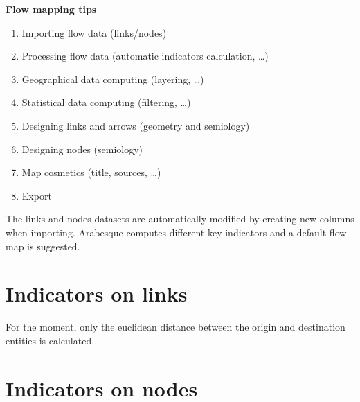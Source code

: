 \documentclass[
  letterpaper,
  DIV=11,
  numbers=noendperiod]{scrreprt}
\providecommand{\tightlist}{%
  \setlength{\itemsep}{0pt}\setlength{\parskip}{0pt}}\usepackage{longtable,booktabs,array}
\begin{document}
\begin{tcolorbox}[enhanced jigsaw, rightrule=.15mm, bottomrule=.15mm, colback=white, breakable, opacityback=0, colframe=quarto-callout-tip-color-frame, toprule=.15mm, leftrule=.75mm, arc=.35mm, left=2mm]
\begin{minipage}[t]{5.5mm}
\textcolor{quarto-callout-tip-color}{\faLightbulb}
\end{minipage}%
\begin{minipage}[t]{\textwidth - 5.5mm}

\vspace{-3mm}\textbf{Flow mapping tips}\vspace{3mm}

\begin{enumerate}
\def\labelenumi{\arabic{enumi}.}
\tightlist
\item
  Importing flow data (links/nodes)
\item
  Processing flow data (automatic indicators calculation, \ldots)
\item
  Geographical data computing (layering, \ldots)
\item
  Statistical data computing (filtering, \ldots)
\item
  Designing links and arrows (geometry and semiology)
\item
  Designing nodes (semiology)
\item
  Map cosmetics (title, sources, \ldots)
\item
  Export
\end{enumerate}

\end{minipage}%
\end{tcolorbox}

The links and nodes datasets are automatically modified by creating new
columns when importing. Arabesque computes different key indicators and
a default flow map is suggested.

\section{Indicators on links}\label{indicators-on-links}

For the moment, only the euclidean distance between the origin and
destination entities is calculated.

\section{Indicators on nodes}\label{indicators-on-nodes}
\end{document}
